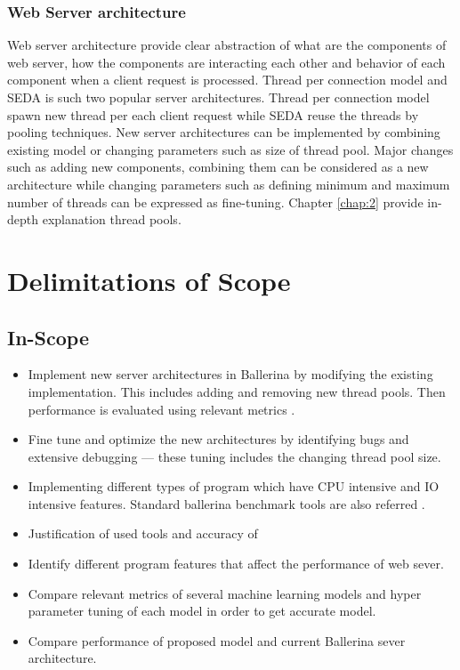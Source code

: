 \subsubsection{Web Server architecture} \label{sub:def_web_server_architecture}

 Web server architecture provide clear abstraction of what are the components of web server, how the components are interacting each other and behavior of each component when a client request is processed. Thread per connection model \cite{comp_ac} and SEDA \cite{seda} is such two popular server architectures. Thread per connection model spawn new thread per each client request while SEDA reuse the threads by pooling techniques. New server architectures can be implemented by combining existing model or changing parameters such as size of thread pool. Major changes such as adding new components, combining them can be considered as a new architecture while changing parameters such as defining minimum and maximum number of threads can be expressed as fine-tuning. Chapter \ref{chap:2} provide in-depth explanation thread pools.


\section{Delimitations of Scope}

\subsection{In-Scope}

\begin{itemize}
	\item Implement new server architectures in Ballerina by modifying the existing implementation. This includes adding and removing new thread pools. Then performance is evaluated using relevant metrics .
	\item Fine tune and optimize the new architectures by identifying bugs and extensive debugging — these tuning includes the changing thread pool size.
	\item Implementing different types of program which have CPU intensive and IO intensive features. Standard ballerina benchmark tools are also referred \cite{Ballerina_Performance}. 
	\item Justification of used tools and accuracy of 
	\item Identify different program features that affect the performance of web sever.
	\item Compare relevant metrics of several machine learning models and hyper parameter tuning of each model in order to get accurate model.
	\item Compare performance of proposed model and current Ballerina sever architecture.  
\end{itemize}

